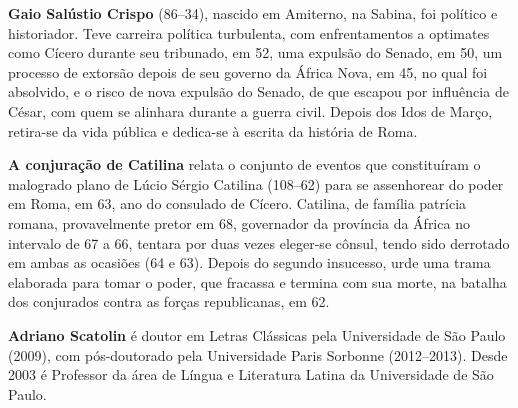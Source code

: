\textbf{Gaio Salústio Crispo} (86--34), nascido em Amiterno, na Sabina, foi político e historiador. Teve carreira política turbulenta, com enfrentamentos a optimates como Cícero durante seu tribunado, em 52, uma expulsão do Senado, em 50, um processo de extorsão depois de seu governo da África Nova, em 45, no qual foi absolvido, e o risco de nova expulsão do Senado, de que escapou por influência de César, com quem se alinhara durante a guerra civil. Depois dos Idos de Março, retira-se da vida pública e dedica-se à escrita da história de Roma.


\textbf{A conjuração de Catilina} relata o conjunto de eventos que constituíram o malogrado plano de Lúcio
Sérgio Catilina (108--62) para se assenhorear do poder em Roma, em 63,
ano do consulado de Cícero. Catilina, de família patrícia romana,
provavelmente pretor em 68, governador da província da África no intervalo
de 67 a 66, tentara por duas vezes eleger-se cônsul, tendo sido derrotado
em ambas as ocasiões (64 e 63). Depois do segundo insucesso, urde uma trama elaborada
para tomar o poder, que fracassa e termina com sua morte, na batalha dos conjurados contra as forças republicanas, em 62.


\textbf{Adriano Scatolin} é doutor em Letras Clássicas pela
Universidade de São Paulo (2009), com pós-doutorado pela Universidade Paris
 Sorbonne (2012--2013). Desde 2003 é Professor da área de Língua e Literatura Latina da Universidade de
São Paulo.

